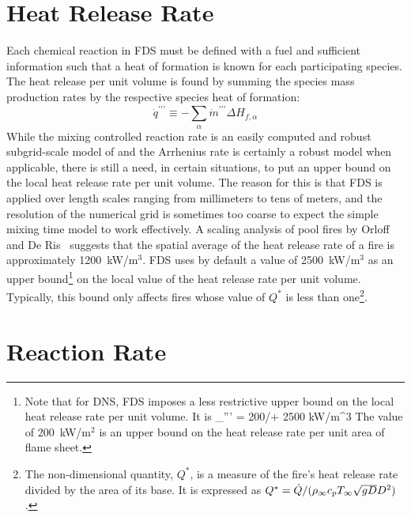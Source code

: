 \section{Heat Release Rate}

Each chemical reaction in FDS must be defined with a fuel and sufficient information such that a heat of formation is known for each participating species. The heat release per unit volume is found by summing the species mass production rates by the respective species heat of formation:
\begin{equation}\label{eq:vol_heat_gen}
\dot{q}^{\prime\prime\prime} \equiv -\displaystyle \sum_{\alpha} \dot{m}^{\prime\prime\prime} \Delta H_{f,\alpha}
\end{equation}
While the mixing controlled reaction rate is an easily computed and robust subgrid-scale model of and the Arrhenius rate is certainly a robust model when applicable, there is still a need, in certain situations, to put an upper bound on the local heat release rate per unit volume. The reason for
this is that FDS is applied over length scales ranging from millimeters to tens of meters, and the resolution of the numerical grid
is sometimes too coarse to expect the simple mixing time model to work effectively.
A scaling analysis of pool fires by Orloff and De Ris~\cite{Orloff:19th_Symposium} suggests that the spatial average of the
heat release rate of a fire is approximately 1200~kW/m$^3$. FDS uses by default a value of 2500~kW/m$^3$ as an upper bound\footnote{Note that
for DNS, FDS imposes a less restrictive upper bound on the local heat release rate per unit volume. It is
\be \dq_{\max}''' = 200/\dx + 2500 \quad \hbox{kW/m}^3 \ee
The value of 200~kW/m$^2$ is an upper bound on the heat release rate per unit area of flame sheet.}
on the local value of the heat release rate per unit volume. Typically, this bound only affects fires whose value of $Q^*$
is less than one\footnote{The non-dimensional quantity, $Q^*$, is a measure of the fire's heat release rate divided by the
area of its base. It is expressed as $Q^*=\dot{Q}/(\rho_\infty c_p T_\infty \sqrt{g D} D^2)$.}.

\section{Reaction Rate} 

\label{Reaction_Rate_Model}


